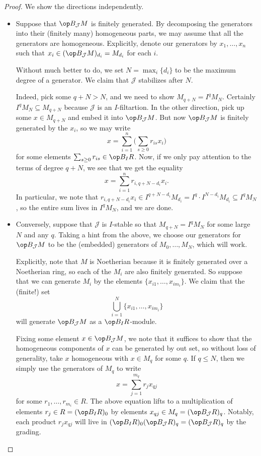 \begin{proof}
	We show the directions independently.
	\begin{itemize}
		\item Suppose that $\op B_\mathcal JM$ is finitely generated. By decomposing the generators into their (finitely many) homogeneous parts, we may assume that all the generators are homogeneous. Explicitly, denote our generators by $x_1,\ldots,x_n$ such that $x_i\in(\op B_\mathcal JM)_{d_i}=M_{d_i}$ for each $i$.
		
		Without much better to do, we set $N=\max_i\{d_i\}$ to be the maximum degree of a generator. We claim that $\mathcal J$ stabilizes after $N$.

		Indeed, pick some $q+N>N$, and we need to show $M_{q+N}=I^qM_N$. Certainly $I^qM_N\subseteq M_{q+N}$ because $\mathcal J$ is an $I$-filtartion. In the other direction, pick up some $x\in M_{q+N}$ and embed it into $\op B_\mathcal JM$. But now $\op B_\mathcal JM$ is finitely generated by the $x_i$, so we may write
		\[x=\sum_{i=1}^n\Bigg(\sum_{s\ge0}r_{is}x_i\Bigg)\]
		for some elements $\sum_{s\ge0}r_{is}\in\op B_IR$. Now, if we only pay attention to the terms of degree $q+N$, we see that we get the equality
		\[x=\sum_{i=1}^nr_{i,q+N-d_i}x_i.\]
		In particular, we note that $r_{i,q+N-d_i}x_i\in I^{q+N-d_i}M_{d_i}=I^q\cdot I^{N-d_i}M_{d_i}\subseteq I^qM_N$, so the entire sum lives in $I^qM_N$, and we are done.

		\item Conversely, suppose that $\mathcal J$ is $I$-stable so that $M_{q+N}=I^qM_N$ for some large $N$ and any $q$. Taking a hint from the above, we choose our generators for $\op B_\mathcal JM$ to be the (embedded) generators of $M_0,\ldots,M_N$, which will work.

		Explicitly, note that $M$ is Noetherian because it is finitely generated over a Noetherian ring, so each of the $M_i$ are also finitely generated. So suppose that we can generate $M_i$ by the elements $\{x_{i1},\ldots,x_{im_i}\}$. We claim that the (finite!) set
		\[\bigcup_{i=1}^N\{x_{i1},\ldots,x_{im_i}\}\]
		will generate $\op B_{\mathcal J}M$ as a $\op B_IR$-module.

		Fixing some element $x\in\op B_\mathcal JM$, we note that it suffices to show that the homogeneous components of $x$ can be generated by out set, so without loss of generality, take $x$ homogeneous with $x\in M_q$ for some $q$. If $q\le N$, then we simply use the generators of $M_q$ to write
		\[x=\sum_{j=1}^{m_q}r_jx_{qj}\]
		for some $r_1,\ldots,r_{m_i}\in R$. The above equation lifts to a multiplication of elements $r_j\in R=(\op B_IR)_0$ by elements $x_{qj}\in M_q=(\op B_\mathcal JR)_q$. Notably, each product $r_jx_{qj}$ will live in $(\op B_IR)_0(\op B_\mathcal JR)_q=(\op B_\mathcal JR)_q$ by the grading.


\end{itemize}
\end{proof}
